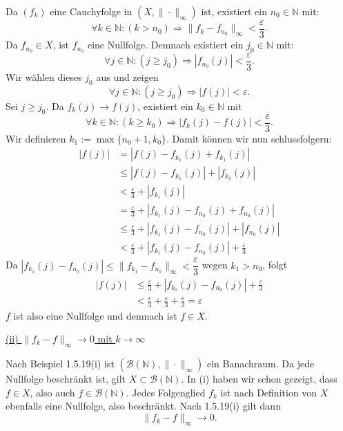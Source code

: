 \documentclass[a4paper,12pt]{article}
\begin{document}
\begin{enumerate}[label=\alph*)]
    Da $(f_k)$ eine Cauchyfolge in $(X, \|\cdot\|_\infty)$ ist, existiert ein $n_0 \in \mathbb{N}$ mit:
    \[
        \forall k \in \mathbb{N} : (k > n_0) \Rightarrow \|f_k - f_{n_0}\|_\infty < \frac{\varepsilon}{3}.
    \]
    Da $f_{n_0} \in X$, ist $f_{n_0}$ eine Nullfolge. Demnach existiert ein $j_0 \in \mathbb{N}$ mit:
    \[
        \forall j \in \mathbb{N} : (j \geq j_0) \Rightarrow |f_{n_0}(j)| < \frac{\varepsilon}{3}.
    \]
    Wir wählen dieses $j_0$ aus und zeigen
    \[
        \forall j \in \mathbb{N} : (j \geq j_0) \Rightarrow |f(j)| < \varepsilon.
    \]
    Sei $j \geq j_0$. Da $f_k(j) \to f(j)$, existiert ein $k_0 \in \mathbb{N}$ mit
    \[
        \forall k \in \mathbb{N} : (k \geq k_0) \Rightarrow |f_k(j) - f(j)| < \frac{\varepsilon}{3}.
    \]
    Wir definieren $k_1 := \max\{n_0 + 1, k_0\}$.
    Damit können wir nun schlussfolgern:
    \begin{align*}
        |f(j)| &= |f(j) - f_{k_1}(j) + f_{k_1}(j)| \\
               &\leq |f(j) - f_{k_1}(j)| + |f_{k_1}(j)| \\
               &< \frac{\varepsilon}{3} + |f_{k_1}(j)| \\
               &= \frac{\varepsilon}{3} + |f_{k_1}(j) - f_{n_0}(j) + f_{n_0}(j)| \\
               &\leq \frac{\varepsilon}{3} + |f_{k_1}(j) - f_{n_0}(j)| + |f_{n_0}(j)| \\
               &< \frac{\varepsilon}{3} + |f_{k_1}(j) - f_{n_0}(j)| + \frac{\varepsilon}{3}
    \end{align*}
    Da $|f_{k_1}(j) - f_{n_0}(j)| \leq \|f_{k_1} - f_{n_0}\|_\infty < \dfrac{\varepsilon}{3}$
    wegen $k_1 > n_0$, folgt
    \begin{align*}
        |f(j)| &\leq \frac{\varepsilon}{3} + |f_{k_1}(j) - f_{n_0}(j)| + \frac{\varepsilon}{3} \\
               &< \frac{\varepsilon}{3} + \frac{\varepsilon}{3} + \frac{\varepsilon}{3} = \varepsilon
    \end{align*}
    $f$ ist also eine Nullfolge und demnach ist $f \in X$.

    \underline{(ii) $\|f_k - f\|_\infty \to 0$ mit $k \to \infty$}

    Nach Beispiel 1.5.19(i) ist $(\mathcal{B}(\mathbb{N}), \|\cdot\|_\infty)$ ein Banachraum.
    Da jede Nullfolge beschränkt ist, gilt $X \subset \mathcal{B}(\mathbb{N})$.
    In (i) haben wir schon gezeigt, dass $f \in X$, also auch $f \in \mathcal{B}(\mathbb{N})$.
    Jedes Folgenglied $f_k$ ist nach Definition von $X$ ebenfalls eine Nullfolge, also beschränkt.
    Nach 1.5.19(i) gilt dann
    \[
        \|f_k - f\|_\infty \to 0.
    \]


\end{enumerate}
\end{document}
